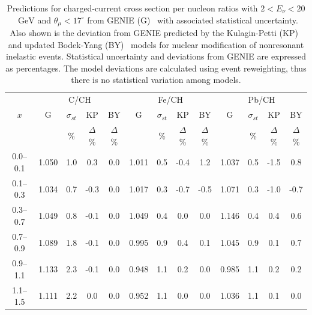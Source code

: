 \documentclass[aps,preprint,showpacs,superscriptaddress]{revtex4} %
\newcommand{\GeV}{\ensuremath{\mbox{GeV}}\xspace}
\newcommand{\Xbj}{\ensuremath{x}\xspace}
\newcommand{\Enu}{\ensuremath{E_{\nu}}\xspace}
\newcommand{\thetamu}{\ensuremath{\theta_{\mu}}\xspace}
\begin{document}
\begin{table}
\tiny
\begin{tabular}{c|cccc|cccc|cccc}
\hline \hline
& \multicolumn{4}{c}{C/CH} & \multicolumn{4}{c}{Fe/CH} & \multicolumn{4}{c}{Pb/CH} \\ 
\Xbj & G & $\sigma_{st}$ & KP & BY & G & $\sigma_{st}$ & KP & BY & G  & $\sigma_{st}$ & KP& BY\\
    &   & \%   & $\Delta$\%         & $\Delta$\%         &   & \%   & $\Delta$\%         &    $\Delta$\%     &    & \%   & $\Delta$\%         &  $\Delta$\%      \\
    \hline
    0.0--0.1 & 1.050 & 1.0 & 0.3 & 0.0 & 1.011 & 0.5 & -0.4 & 1.2 & 1.037 & 0.5 & -1.5 & 0.8 \\ 
    0.1--0.3 & 1.034 & 0.7 & -0.3 & 0.0 & 1.017 & 0.3 & -0.7 & -0.5 & 1.071 & 0.3 & -1.0 & -0.7 \\ 
    0.3--0.7 & 1.049 & 0.8 & -0.1 & 0.0 & 1.049 & 0.4 & 0.0 & 0.0 & 1.146 & 0.4 & 0.4 & 0.6 \\ 
    0.7--0.9 & 1.089 & 1.8 & -0.1 & 0.0 & 0.995 & 0.9 & 0.4 & 0.1 & 1.045 & 0.9 & 0.1 & 0.7 \\ 
    0.9--1.1 & 1.133 & 2.3 & -0.1 & 0.0 & 0.948 & 1.1 & 0.2 & 0.0 & 0.985 & 1.1 & 0.2 & 0.2 \\ 
    1.1--1.5 & 1.111 & 2.2 & 0.0 & 0.0 & 0.952 & 1.1 & 0.0 &  0.0 & 1.036 & 1.1 & 0.1 & 0.0 \\  
    \hline \hline 
    \end{tabular} 
    \caption{Predictions for charged-current cross section per nucleon ratios with $2<\Enu<20$~\GeV and $\thetamu<17^{\circ}$ from GENIE (G)~\cite{Bodek:2004pc} with associated statistical uncertainty.  Also shown is the deviation from GENIE predicted by the Kulagin-Petti (KP)~\cite{PhysRevD.76.094023,Kulagin2006126} and updated Bodek-Yang (BY)~\cite{by13} models for nuclear modification of nonresonant inelastic events.  Statistical uncertainty and deviations from GENIE are expressed as percentages.  The model deviations are calculated using event reweighting, thus there is no statistical variation among models.}
    \label{tab:models_table} 
    \end{table} 
    \endgroup
\clearpage


\end{document}
